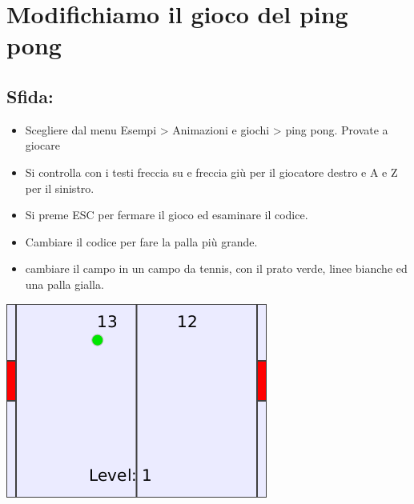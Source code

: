 \chapter{Modifichiamo il gioco del ping pong}
\begin{multicols}{2}
\section*{\color{BrickRed}Sfida:}


\begin{itemize}

\item {Scegliere dal menu Esempi > Animazioni e giochi > ping pong. Provate a giocare}
\item {Si controlla con i testi freccia su e freccia giù per il giocatore destro e A e Z per il sinistro.}
\item {Si preme ESC per fermare il gioco ed esaminare il codice.}
\item {Cambiare il codice per fare la palla più grande.}
\item {cambiare il campo in un campo da tennis, con il prato verde, linee bianche ed una palla gialla.}

\end{itemize}



\columnbreak

\begin{center}
\includegraphics{../img/pong.png}
\end{center}

\end{multicols}

